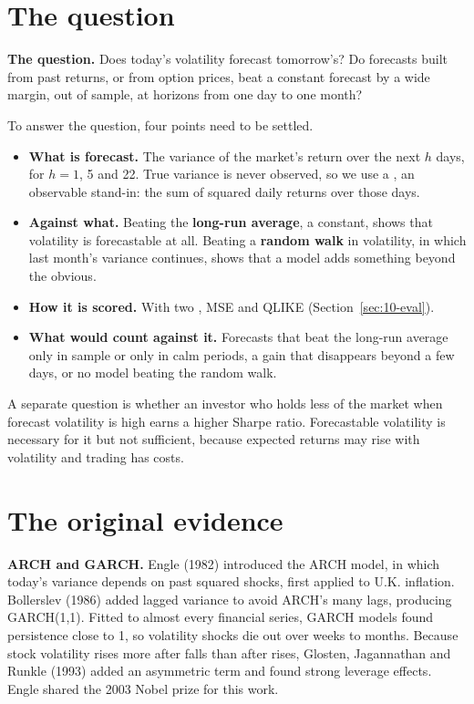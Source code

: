 \section{The question}
\label{sec:10-claim}

\begin{callout}
\textbf{The question.} Does today's volatility forecast tomorrow's? Do forecasts built from past returns, or from option prices, beat a constant forecast by a wide margin, out of sample, at horizons from one day to one month?
\end{callout}

To answer the question, four points need to be settled.

\begin{itemize}
  \item \textbf{What is forecast.} The variance of the market's return over the next $h$ days, for $h = 1$, 5 and 22. True variance is never observed, so we use a , an observable stand-in: the sum of squared daily returns over those days.
  \item \textbf{Against what.} Beating the \textbf{long-run average}, a constant, shows that volatility is forecastable at all. Beating a \textbf{random walk} in volatility, in which last month's variance continues, shows that a model adds something beyond the obvious.
  \item \textbf{How it is scored.} With two , MSE and QLIKE (Section~\ref{sec:10-eval}).
  \item \textbf{What would count against it.} Forecasts that beat the long-run average only in sample or only in calm periods, a gain that disappears beyond a few days, or no model beating the random walk.
\end{itemize}

A separate question is whether an investor who holds less of the market when forecast volatility is high earns a higher Sharpe ratio. Forecastable volatility is necessary for it but not sufficient, because expected returns may rise with volatility and trading has costs.

\section{The original evidence}
\label{sec:10-evidence}

\textbf{ARCH and GARCH.} Engle (1982) introduced the ARCH model, in which today's variance depends on past squared shocks, first applied to U.K. inflation. Bollerslev (1986) added lagged variance to avoid ARCH's many lags, producing GARCH(1,1). Fitted to almost every financial series, GARCH models found persistence close to 1, so volatility shocks die out over weeks to months. Because stock volatility rises more after falls than after rises, Glosten, Jagannathan and Runkle (1993) added an asymmetric term and found strong leverage effects. Engle shared the 2003 Nobel prize for this work.


